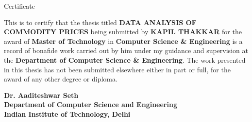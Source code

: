 \begin{center}
\LARGE{ Certificate} 
\end{center}

\vspace{0.5in}

This is to certify that the thesis titled {\bfseries DATA ANALYSIS OF COMMODITY PRICES} being submitted by
{\bfseries KAPIL THAKKAR} for the award of {\bfseries Master of Technology} in {\bfseries Computer Science \& Engineering} is a record of bonafide work carried out by him under my guidance and supervision at the {\bfseries Department of Computer Science \& Engineering}. The work presented in this thesis has not been submitted elsewhere either in part or full, for the award of any other degree or diploma.

\vspace{1.5in}


{\bfseries Dr. Aaditeshwar Seth} \\
{\bfseries Department of Computer Science and Engineering} \\
{\bfseries Indian Institute of Technology, Delhi}\\ 
